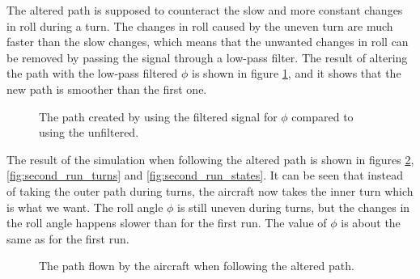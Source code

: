 The altered path is supposed to counteract the slow and more constant changes in roll during a turn. The changes in roll caused by the uneven turn are much faster than the slow changes, which means that the unwanted changes in roll can be removed by passing the signal through a low-pass filter. The result of altering the path with the low-pass filtered $\phi$ is shown in figure \ref{fig:filtered_vs_unfiltered}, and it shows that the new path is smoother than the first one.

\begin{figure}[]
    \centering
    \caption{The path created by using the filtered signal for $\phi$ compared to using the unfiltered.}
	\label{fig:filtered_vs_unfiltered}
\end{figure}

The result of the simulation when following the altered path is shown in figures \ref{fig:second_run_path}, \ref{fig:second_run_turns} and \ref{fig:second_run_states}. It can be seen that instead of taking the outer path during turns, the aircraft now takes the inner turn which is what we want. The roll angle $\phi$ is still uneven during turns, but the changes in the roll angle happens slower than for the first run. The value of $\phi$ is about the same as for the first run.

\begin{figure}[]
    \centering
    \caption{The path flown by the aircraft when following the altered path.}
	\label{fig:second_run_path}
\end{figure}

